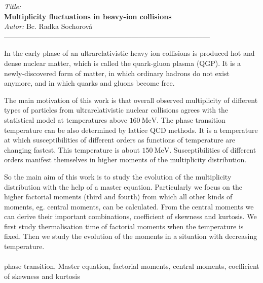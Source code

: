  \newpage
\thispagestyle{empty}
 \noindent
{\it Title:}\\
{\bf Multiplicity fluctuations in heavy-ion collisions}\\

\noindent
{\it Autor:} Bc. Radka Sochorová \\
--------------------------------------------------------------------------------------- \\


In the early phase of an ultrarelativistic heavy ion collisions is produced hot and dense nuclear matter, which is called the quark-gluon plasma (QGP). It is a newly-discovered form of matter, in which ordinary hadrons do not exist anymore, and in which quarks and gluons become free. 

The main motivation of this work is that overall observed multiplicity of different types of particles from ultrarelativistic nuclear collisions agrees with the statistical model at temperatures above $160 ~\mathrm{MeV}$. The phase transition temperature can be also determined by lattice QCD methods. It is a temperature at which susceptibilities of different orders as functions of temperature are changing fastest. This temperature is about $150 ~\mathrm{MeV}$. Susceptibilities of different orders manifest
themselves in higher moments of the multiplicity distribution.

So the main aim of this work is to study the evolution of the multiplicity distribution with the help of a master equation. Particularly we focus on the higher factorial moments (third and fourth) from which all other kinds of moments, eg. central moments, can be calculated. From the central moments we can derive their important combinations, coefficient of skewness and kurtosis. We first study thermalisation time of factorial moments when the temperature is fixed. Then we study the evolution of the moments 
in a situation with decreasing temperature. 
\\
\\
 phase transition, Master equation,  factorial moments, central moments, coefficient of skewness and kurtosis

%
